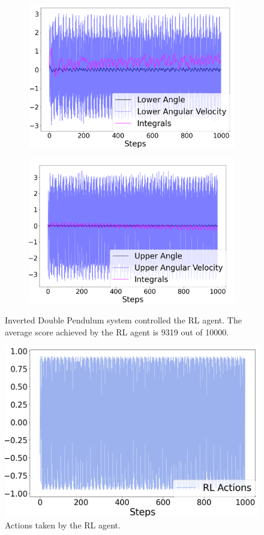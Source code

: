 \documentclass[AMS,STIX1COL]{WileyNJD-v2}
\begin{document}
\begin{figure}
\centering
\begin{subfigure}{0.3\textwidth}
\centering
\includegraphics[width=\linewidth]{double_RL.png}
\end{subfigure}
\begin{subfigure}{0.3\textwidth}
\centering
\includegraphics[width=\linewidth]{double_RL_upper.png}
\end{subfigure}
\caption{Inverted Double Pendulum system controlled the RL agent. The average score achieved by the RL agent is 9319 out of 10000. }
\label{fig:double_rl}
\end{figure}


\begin{figure}
\centering
\includegraphics[width=.3\textwidth]{double_RL_actions.png}
\caption{Actions taken by the RL agent.}
\label{fig:double_rl_actions}
\end{figure}
\end{document}
